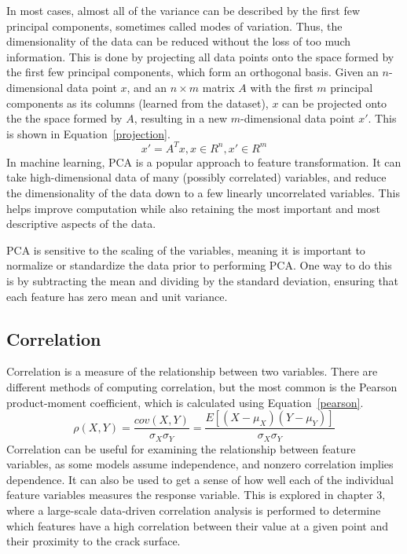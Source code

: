 In most cases, almost all of the variance can be described by the first few principal components, sometimes called modes of variation.  Thus, the dimensionality of the data can be reduced without the loss of too much information.  This is done by projecting all data points onto the space formed by the first few principal components, which form an orthogonal basis.  Given an $n$-dimensional data point $x$, and an $n \times m$ matrix $A$ with the first $m$ principal components as its columns (learned from the dataset), $x$ can be projected onto the the space formed by $A$, resulting in a new $m$-dimensional data point $x'$.  This is shown in Equation~\ref{projection}.
%
\begin{equation} 
x' = A^T x, x \in R^n, x' \in R^m
\label{projection}
\end{equation}
%
In machine learning, PCA is a popular approach to feature transformation.  It can take high-dimensional data of many (possibly correlated) variables, and reduce the dimensionality of the data down to a few linearly uncorrelated variables.  This helps 
improve computation while also retaining the most important and most descriptive aspects of the data.

PCA is sensitive to the scaling of the variables, meaning it is important to normalize or standardize the data prior to performing PCA.  One way to do this is by subtracting the mean and dividing by the standard deviation, ensuring that each feature has zero mean and unit variance.

\subsection{Correlation}
Correlation is a measure of the relationship between two variables.  There are different methods of computing correlation, but the most common is the Pearson product-moment coefficient, which is calculated using Equation~\ref{pearson}.
%
\begin{equation}
\rho(X, Y) = \frac{cov(X, Y)}{\sigma_X \sigma_Y} = \frac{E[(X - \mu_X)(Y - \mu_Y)]}{\sigma_X \sigma_Y}
\label{pearson}
\end{equation}
%
Correlation can be useful for examining the relationship between feature variables, as some models assume independence, and nonzero correlation implies dependence.  It can also be used to get a sense of how well each of the individual feature variables measures the response variable.  This is explored in chapter 3, where a large-scale data-driven correlation analysis is performed to determine which features have a high correlation between their value at a given point and their proximity to the crack surface.

